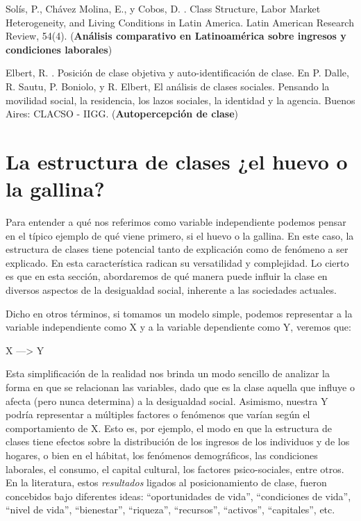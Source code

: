 \documentclass[
]{book}
\begin{document}
Solís, P., Chávez Molina, E., y Cobos, D. \citeyearpar{Solis.etal2019}. Class Structure, Labor Market Heterogeneity, and Living Conditions in Latin America. Latin American Research Review, 54(4). (\textbf{Análisis comparativo en Latinoamérica sobre ingresos y condiciones laborales})

Elbert, R. \citeyearpar{Elbert2020}. Posición de clase objetiva y auto-identificación de clase. En P. Dalle, R. Sautu, P. Boniolo, y R. Elbert, El análisis de clases sociales. Pensando la movilidad social, la residencia, los lazos sociales, la identidad y la agencia. Buenos Aires: CLACSO - IIGG. (\textbf{Autopercepción de clase})

\hypertarget{huevo}{%
\section{La estructura de clases ¿el huevo o la gallina?}\label{huevo}}

Para entender a qué nos referimos como variable independiente podemos pensar en el típico ejemplo de qué viene primero, si el huevo o la gallina. En este caso, la estructura de clases tiene potencial tanto de explicación como de fenómeno a ser explicado. En esta característica radican su versatilidad y complejidad. Lo cierto es que en esta sección, abordaremos de qué manera puede influir la clase en diversos aspectos de la desigualdad social, inherente a las sociedades actuales.

Dicho en otros términos, si tomamos un modelo simple, podemos representar a la variable independiente como X y a la variable dependiente como Y, veremos que:

X ---\textgreater{} Y

Esta simplificación de la realidad nos brinda un modo sencillo de analizar la forma en que se relacionan las variables, dado que es la clase aquella que influye o afecta (pero nunca determina) a la desigualdad social. Asimismo, nuestra Y podría representar a múltiples factores o fenómenos que varían según el comportamiento de X. Esto es, por ejemplo, el modo en que la estructura de clases tiene efectos sobre la distribución de los ingresos de los individuos y de los hogares, o bien en el hábitat, los fenómenos demográficos, las condiciones laborales, el consumo, el capital cultural, los factores psico-sociales, entre otros. En la literatura, estos \emph{resultados} ligados al posicionamiento de clase, fueron concebidos bajo diferentes ideas: ``oportunidades de vida'', ``condiciones de vida'', ``nivel de vida'', ``bienestar'', ``riqueza'', ``recursos'', ``activos'', ``capitales'', etc.
\end{document}
